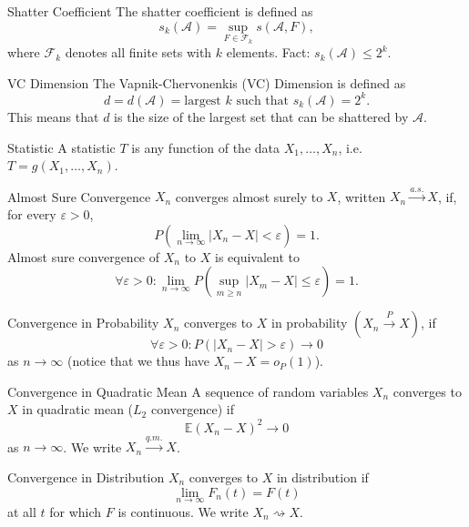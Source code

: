 \documentclass[avery5371,grid]{flashcards}
\begin{document}
\begin{flashcard}[Definition]{Shatter Coefficient}
 The shatter coefficient is defined as
 \[
 s_k(\mathcal{A}) = \sup_{F\in \mathcal{F}_k} s(\mathcal{A},F),
 \]
where $\mathcal{F}_k$ denotes all finite sets with $k$ elements. 
Fact: $s_k(\mathcal{A}) \le 2^k$. 
\end{flashcard}



\begin{flashcard}[Definition]{VC Dimension}
 The Vapnik-Chervonenkis (VC) Dimension is defined as
 \[
 d = d(\mathcal{A}) = \text{largest $k$ such that } s_k(\mathcal{A}) = 2^k.
 \]
This means that $d$ is the size of the largest set that can be shattered by $\mathcal{A}$.
\end{flashcard}

\begin{flashcard}[Definition]{Statistic}
A statistic $T$ is any function of the data $X_1, \ldots, X_n$, i.e. $T=g(X_1,\ldots,X_n)$.
\end{flashcard}

\begin{flashcard}[Definition]{Almost Sure Convergence}
$X_n$ converges almost surely to $X$, written $X_n \overset{a.s.}{\longrightarrow} X$, if, for every $\varepsilon > 0$, 
\[
P\left( \lim_{n \to \infty} \left| X_n - X \right| < \varepsilon \right) = 1.
\]
Almost sure convergence of $X_n$ to $X$ is equivalent to 
\[
\forall \varepsilon > 0: \lim_{n \to \infty} P\left( \sup_{m \ge n} \left| X_m - X \right| \le \varepsilon \right) = 1.
\]
\end{flashcard}

\begin{flashcard}[Definition]{Convergence in Probability}
$X_n$ converges to $X$ in probability $(X_n \overset{P}{\longrightarrow} X)$, if
\[
\forall \varepsilon > 0: P\left( \left| X_n - X \right| > \varepsilon \right) \to 0
\]
as $n \to \infty$ (notice that we thus have $X_n - X = o_P(1)$).
\end{flashcard}

\begin{flashcard}[Definition]{Convergence in Quadratic Mean}
A sequence of random variables $X_n$ converges to $X$ in quadratic mean ($L_2$ convergence) if 
\[
\mathbb{E}(X_n - X)^2 \to 0
\]
as $n \to \infty$. We write $X_n \overset{q.m.}{\longrightarrow} X$.
\end{flashcard}

\begin{flashcard}[Definition]{Convergence in Distribution}
 $X_n$ converges to $X$ in distribution if 
 \[
 \lim_{n \to \infty} F_n(t) = F(t)
 \]
 at all $t$ for which $F$ is continuous. We write $X_n \rightsquigarrow X$.
\end{flashcard}
\end{document}
